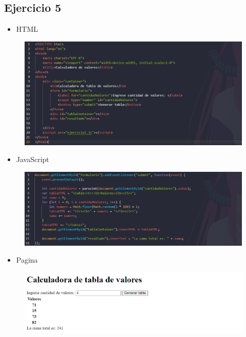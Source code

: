 \documentclass{article}
\begin{document}
	\subsection{Ejercicio 5}
	\begin{itemize}
		\item HTML
	\end{itemize}
	\begin{figure}[H]
		\centering
		\includegraphics[width=1.0\textwidth, keepaspectratio]{img/ejercicio5a}
	\end{figure}
	\begin{itemize}
		\item JavaScript
	\end{itemize}
	\begin{figure}[H]
		\centering
		\includegraphics[width=1.0\textwidth, keepaspectratio]{img/ejercicio5b}
	\end{figure}
	\begin{itemize}
		\item Pagina
	\end{itemize}
	\begin{figure}[H]
		\centering
		\includegraphics[width=1.0\textwidth, keepaspectratio]{img/ejercicio5c}
	\end{figure}
	
\end{document}
